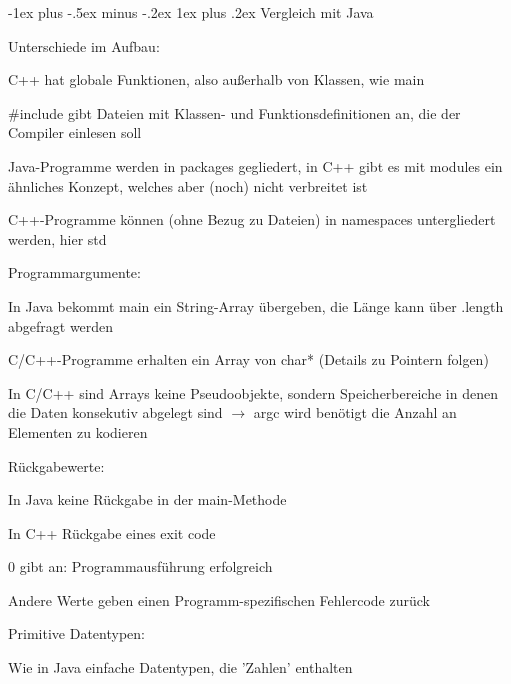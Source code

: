 \documentclass[10pt]{article}
\makeatletter
\renewcommand{\subsubsection}{\@startsection{subsubsection}{3}{0mm}%
                                {-1ex plus -.5ex minus -.2ex}%
                                {1ex plus .2ex}%
                                {\normalfont\small\bfseries}}
\makeatother
\begin{document}
\subsubsection{Vergleich mit Java}
\begin{itemize*}
  \item Unterschiede im Aufbau:
  \begin{itemize*}
    \item C++ hat globale Funktionen, also außerhalb von Klassen, wie main
    \item \#include gibt Dateien mit Klassen- und Funktionsdefinitionen an, die der Compiler einlesen soll
    \item Java-Programme werden in packages gegliedert, in C++ gibt es mit modules ein ähnliches Konzept, welches aber (noch) nicht verbreitet ist
    \item C++-Programme können (ohne Bezug zu Dateien) in namespaces untergliedert werden, hier std
  \end{itemize*}
  \item Programmargumente:
  \begin{itemize*}
    \item In Java bekommt main ein String-Array übergeben, die Länge kann über .length abgefragt werden
    \item C/C++-Programme erhalten ein Array von char* (Details zu Pointern folgen)
    \item In C/C++ sind Arrays keine Pseudoobjekte, sondern Speicherbereiche in denen die Daten konsekutiv abgelegt sind $\rightarrow$ argc wird benötigt die Anzahl an Elementen zu kodieren
  \end{itemize*}
  \item Rückgabewerte:
  \begin{itemize*}
    \item In Java keine Rückgabe in der main-Methode
    \item In C++ Rückgabe eines exit code
    \begin{itemize*}
      \item 0 gibt an: Programmausführung erfolgreich
      \item Andere Werte geben einen Programm-spezifischen Fehlercode zurück
    \end{itemize*}
  \end{itemize*}
  \item Primitive Datentypen:
  \begin{itemize*}
    \item Wie in Java einfache Datentypen, die 'Zahlen' enthalten

\end{itemize*}
\end{itemize*}
\end{document}
